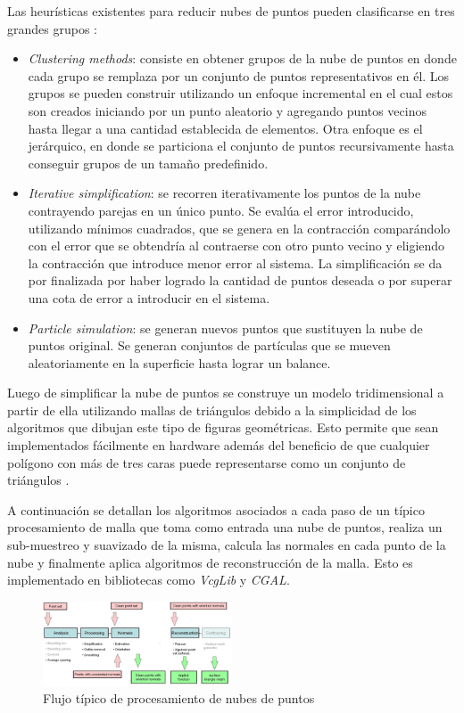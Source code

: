 Las heurísticas existentes para reducir nubes de puntos pueden clasificarse en tres grandes grupos \cite{PntCloud}:
\begin{itemize}
   \item \emph{Clustering methods}: consiste en obtener grupos de la nube de puntos en donde cada grupo se remplaza por un conjunto de puntos representativos en él. Los grupos se pueden construir utilizando un enfoque incremental en el cual estos son creados iniciando por un punto aleatorio y agregando puntos vecinos hasta llegar a una cantidad establecida de elementos. Otra enfoque es el jerárquico, en donde se particiona el conjunto de puntos recursivamente hasta conseguir grupos de un tamaño predefinido.
   \item \emph{Iterative simplification}: se recorren iterativamente los puntos de la nube contrayendo parejas en un único punto. Se evalúa el error introducido, utilizando mínimos cuadrados, que se genera en la contracción comparándolo con el error que se obtendría al contraerse con otro punto vecino y eligiendo la contracción que introduce menor error al sistema. La simplificación se da por finalizada por haber logrado la cantidad de puntos deseada o por superar una cota de error a introducir en el sistema.
   \item \emph{Particle simulation}: se generan nuevos puntos que sustituyen la nube de puntos original. Se generan conjuntos de partículas que se mueven aleatoriamente en la superficie hasta lograr un balance.
\end{itemize}

Luego de simplificar la nube de puntos se construye un modelo tridimensional a partir de ella utilizando mallas de triángulos debido a la simplicidad de los algoritmos que dibujan este tipo de figuras geométricas. Esto permite que sean implementados fácilmente en hardware además del beneficio de que cualquier polígono con más de tres caras puede representarse como un conjunto de triángulos \cite{PCloudTriangle}.

A continuación se detallan los algoritmos asociados a cada paso de un típico procesamiento de malla que toma como entrada una nube de puntos, realiza un sub-muestreo y suavizado de la misma, calcula las normales en cada punto de la nube y finalmente aplica algoritmos de reconstrucción de la malla. Esto es implementado en bibliotecas como \emph{VcgLib}\cite{VCGLib} y \emph{CGAL}\cite{CGAL}.

\begin{figure}[H]
  \centering
    \includegraphics[width=0.5\textwidth]{./Cap2_videomapping/malla-flow.png}
  \caption{Flujo típico de procesamiento de nubes de puntos \cite{CGAL}}
  \label{fig:Mesh-CGAL}
\end{figure}

